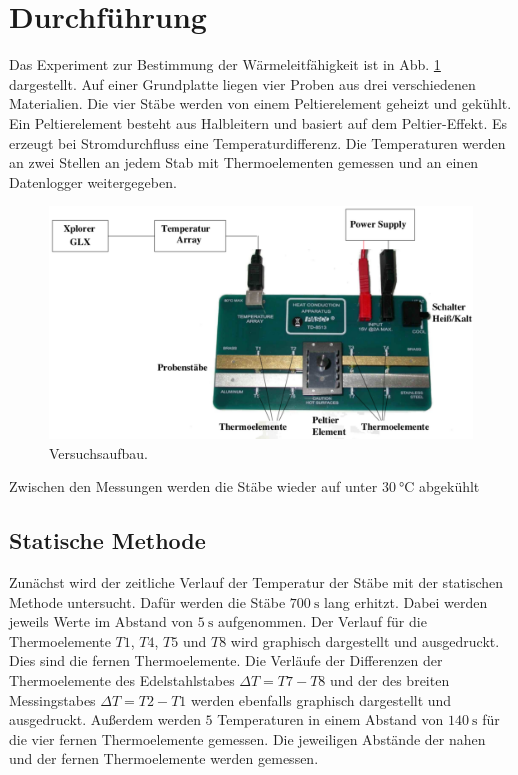 \section{Durchführung}
\label{sec:Durchführung}

Das Experiment zur Bestimmung der Wärmeleitfähigkeit ist in Abb. \ref{fig:versuch} dargestellt. 
Auf einer Grundplatte liegen vier Proben aus drei verschiedenen Materialien. 
Die vier Stäbe werden von einem Peltierelement geheizt und gekühlt.
Ein Peltierelement besteht aus Halbleitern und basiert auf dem Peltier-Effekt.
Es erzeugt bei Stromdurchfluss eine Temperaturdifferenz.
Die Temperaturen werden an zwei Stellen an jedem Stab mit 
Thermoelementen gemessen und an einen Datenlogger weitergegeben.
\begin{figure}
    \centering
    \includegraphics[scale=0.2]{build/aufbau.png}
    \caption{Versuchsaufbau.}
    \label{fig:versuch}
\end{figure}

\noindent Zwischen den Messungen werden die Stäbe wieder auf unter $\SI{30}{\degreeCelsius}$ abgekühlt

\subsection{Statische Methode}
Zunächst wird der zeitliche Verlauf der Temperatur der Stäbe 
mit der statischen Methode untersucht.
Dafür werden die Stäbe $\SI{700}{\second}$ lang erhitzt.
Dabei werden jeweils Werte im Abstand von $\SI{5}{\second}$ aufgenommen.
Der Verlauf für die Thermoelemente
$T1$, $T4$, $T5$ und $T8$ wird graphisch dargestellt und ausgedruckt.
Dies sind die fernen Thermoelemente.
Die Verläufe der Differenzen der Thermoelemente des Edelstahlstabes $\Delta T = T7 - T8$
und der des breiten Messingstabes $\Delta T = T2 - T1$ werden ebenfalls graphisch dargestellt und
ausgedruckt.
Außerdem werden $\num{5}$ Temperaturen in einem Abstand von $\SI{140}{\second}$
für die vier fernen Thermoelemente gemessen.
Die jeweiligen Abstände der nahen und der fernen Thermoelemente werden gemessen.


